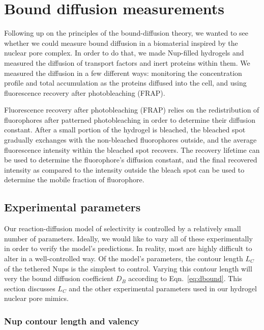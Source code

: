 \chapter{Bound diffusion measurements}\label{ch04}
\label{ch:bound-diffusion}

Following up on the principles of the bound-diffusion theory, we wanted to see whether we could measure bound diffusion in a biomaterial inspired by the nuclear pore complex.  In order to do that, we made Nup-filled hydrogels and measured the diffusion of transport factors and inert proteins within them.  We measured the diffusion in a few different ways: monitoring the concentration profile and total accumulation as the proteins diffused into the cell, and using fluorescence recovery after photobleaching (FRAP).

Fluorescence recovery after photobleaching (FRAP) relies on the redistribution of fluorophores after patterned photobleaching in order to determine their diffusion constant.  After a small portion of the hydrogel is bleached, the bleached spot gradually exchanges with the non-bleached fluorophores outside, and the average fluorescence intensity within the bleached spot recovers.  The recovery lifetime can be used to determine the fluorophore's diffusion constant, and the final recovered intensity as compared to the intensity outside the bleach spot can be used to determine the mobile fraction of fluorophore.

\section{Experimental parameters}

Our reaction-diffusion model of selectivity is controlled by a relatively small number of parameters.  Ideally, we would like to vary all of these experimentally in order to verify the model's predictions.  In reality, most are highly difficult to alter in a well-controlled way.  Of the model's parameters, the contour length $L_C$ of the tethered Nups is the simplest to control.  Varying this contour length will very the bound diffusion coefficient $D_B$ according to Eqn.~\ref{eq:dbound}.  This section discusses $L_C$ and the other experimental parameters used in our hydrogel nuclear pore mimics.

\subsection{Nup contour length and valency}

